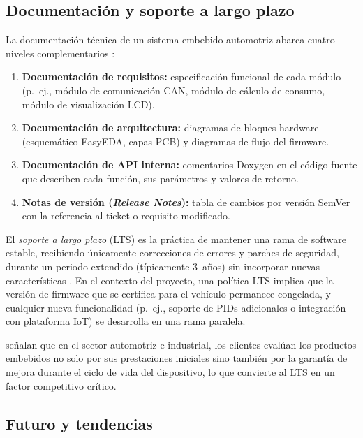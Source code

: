 \subsection{Documentación y soporte a largo plazo}

La documentación técnica de un sistema embebido automotriz
abarca cuatro niveles complementarios \citep{ISO26262_2018}:

\begin{enumerate}
	\item \textbf{Documentación de requisitos:} especificación
	funcional de cada módulo (p.~ej., módulo de
	comunicación CAN, módulo de cálculo de consumo,
	módulo de visualización LCD).
	\item \textbf{Documentación de arquitectura:} diagramas de
	bloques hardware (esquemático EasyEDA, capas PCB) y
	diagramas de flujo del firmware.
	\item \textbf{Documentación de API interna:} comentarios
	Doxygen en el código fuente que describen cada función,
	sus parámetros y valores de retorno.
	\item \textbf{Notas de versión (\textit{Release Notes}):}
	tabla de cambios por versión SemVer con la referencia
	al ticket o requisito modificado.
\end{enumerate}

El \textit{soporte a largo plazo} (LTS) es la práctica de
mantener una rama de software estable, recibiendo únicamente
correcciones de errores y parches de seguridad, durante un
periodo extendido (típicamente 3~años) sin incorporar nuevas
características \citep{NVIDIA_LTS2024}.  En el contexto del
proyecto, una política LTS implica que la versión de firmware
que se certifica para el vehículo permanece congelada, y
cualquier nueva funcionalidad (p.~ej., soporte de PIDs
adicionales o integración con plataforma IoT) se desarrolla
en una rama paralela.

\citet{ipXchange2026} señalan que en el sector automotriz e
industrial, los clientes evalúan los productos embebidos no
solo por sus prestaciones iniciales sino también por la
garantía de mejora durante el ciclo de vida del dispositivo,
lo que convierte al LTS en un factor competitivo crítico.



\subsection{Futuro y tendencias}

